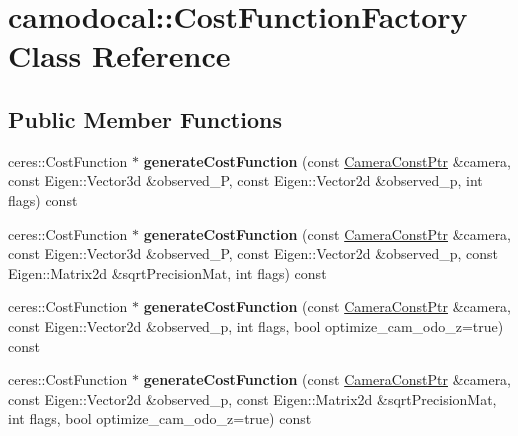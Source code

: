 \hypertarget{classcamodocal_1_1CostFunctionFactory}{}\section{camodocal\+:\+:Cost\+Function\+Factory Class Reference}
\label{classcamodocal_1_1CostFunctionFactory}
\subsection*{Public Member Functions}
\begin{DoxyCompactItemize}
\item 
\mbox{\label{classcamodocal_1_1CostFunctionFactory_adda465ef8c4f2fa757fd0675f9429d36}} 
ceres\+::\+Cost\+Function $\ast$ {\bfseries generate\+Cost\+Function} (const \hyperlink{Camera_8h_a03fe5d6885a007cb4ad26d11f6198586}{Camera\+Const\+Ptr} \&camera, const Eigen\+::\+Vector3d \&observed\+\_\+P, const Eigen\+::\+Vector2d \&observed\+\_\+p, int flags) const
\item 
\mbox{\label{classcamodocal_1_1CostFunctionFactory_abcea9742c67b6d31d373a538ec167e2c}} 
ceres\+::\+Cost\+Function $\ast$ {\bfseries generate\+Cost\+Function} (const \hyperlink{Camera_8h_a03fe5d6885a007cb4ad26d11f6198586}{Camera\+Const\+Ptr} \&camera, const Eigen\+::\+Vector3d \&observed\+\_\+P, const Eigen\+::\+Vector2d \&observed\+\_\+p, const Eigen\+::\+Matrix2d \&sqrt\+Precision\+Mat, int flags) const
\item 
\mbox{\label{classcamodocal_1_1CostFunctionFactory_a8c8da1112f113d2d0ac6e08b23d5303f}} 
ceres\+::\+Cost\+Function $\ast$ {\bfseries generate\+Cost\+Function} (const \hyperlink{Camera_8h_a03fe5d6885a007cb4ad26d11f6198586}{Camera\+Const\+Ptr} \&camera, const Eigen\+::\+Vector2d \&observed\+\_\+p, int flags, bool optimize\+\_\+cam\+\_\+odo\+\_\+z=true) const
\item 
\mbox{\label{classcamodocal_1_1CostFunctionFactory_a2c7a3edbb6f2aba03451c687002ea5c5}} 
ceres\+::\+Cost\+Function $\ast$ {\bfseries generate\+Cost\+Function} (const \hyperlink{Camera_8h_a03fe5d6885a007cb4ad26d11f6198586}{Camera\+Const\+Ptr} \&camera, const Eigen\+::\+Vector2d \&observed\+\_\+p, const Eigen\+::\+Matrix2d \&sqrt\+Precision\+Mat, int flags, bool optimize\+\_\+cam\+\_\+odo\+\_\+z=true) const

\end{DoxyCompactItemize}

